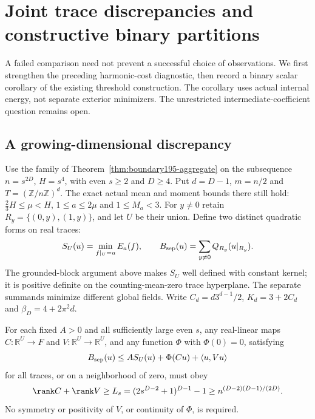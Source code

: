 \section{Joint trace discrepancies and constructive binary partitions}
\label{sec:binary200}
A failed comparison need not prevent a successful choice of observations.
We first strengthen the preceding harmonic-cost diagnostic, then record a
binary scalar corollary of the existing threshold construction.
The corollary uses actual internal energy, not separate exterior
minimizers. The unrestricted intermediate-coefficient question remains open.

\subsection{A growing-dimensional discrepancy}
Use the family of Theorem~\ref{thm:boundary195-aggregate} on the subsequence
$n=s^{2D}$, $H=s^4$, with even $s\ge2$ and $D\ge4$. Put $d=D-1$,
$m=n/2$ and $T=(\mathbb Z/n\mathbb Z)^d$. The exact actual mean and
moment bounds there still hold: $\frac23H\le\mu<H$, $1\le a\le2\mu$
and $1\le M_a<3$.
For $y\ne0$ retain $R_y=\{(0,y),(1,y)\}$, and let $U$ be their union.
Define two distinct quadratic forms on real traces:
\[
 S_U(u)=\min_{f|_U=u}E_a(f),\qquad
 B_{\rm sep}(u)=\sum_{y\ne0}Q_{R_y}(u|_{R_y}).
\]
The grounded-block argument above makes $S_U$ well defined with constant
kernel; it is positive definite on the counting-mean-zero trace hyperplane.
The separate summands minimize different global fields.
Write $C_d=d3^{d-1}/2$, $K_d=3+2C_d$ and $\beta_D=4+2\pi^2d$.
\begin{proposition}\label{prop:jb200-rank}
For each fixed $A>0$ and all sufficiently large even $s$, any real-linear
maps $C:\mathbb R^U\to F$ and $V:\mathbb R^U\to\mathbb R^U$, and any
function $\Phi$ with $\Phi(0)=0$, satisfying
\[
 B_{\rm sep}(u)\le A S_U(u)+\Phi(Cu)+\langle u,Vu\rangle
\]
for all traces, or on a neighborhood of zero, must obey
\[
 \rank C+\rank V\ge L_s=(2s^{D-2}+1)^{D-1}-1
 \ge n^{(D-2)(D-1)/(2D)}.
\]
No symmetry or positivity of $V$, or continuity of $\Phi$, is required.
\end{proposition}
